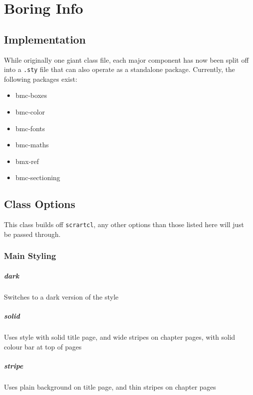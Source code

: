 \documentclass[solid,math,chem,code,plot,gloss]{bmc}
\begin{document}
\chapter{Boring Info}

\section{Implementation}

While originally one giant class file, each major component has now been split off
into a \texttt{.sty} file that can also operate as a standalone package.
Currently, the following packages exist:
\begin{multicols}{2}
    \begin{itemize}
        \item bmc-boxes
        \item bmc-color
        \item bmc-fonts
        \item bmc-maths
        \item bmx-ref
        \item bmc-sectioning
    \end{itemize}
\end{multicols}

\section{Class Options}

This class builds off \texttt{scrartcl},
any other options than those listed here will just be passed through.

\subsection{Main Styling}

\paragraph{\ttfamily dark}
Switches to a dark version of the style
\paragraph{\ttfamily solid}
Uses style with solid title page, and wide stripes on chapter pages, with solid colour bar at top of pages
\paragraph{\ttfamily stripe}
Uses plain background on title page, and thin stripes on chapter pages
\end{document}

